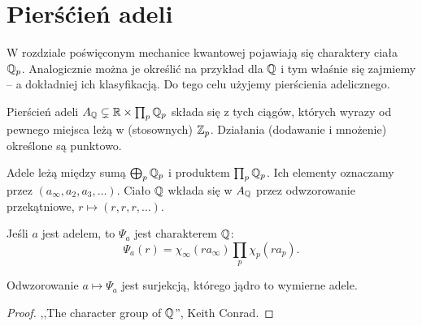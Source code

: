 \section{Pierśćień adeli}
W rozdziale poświęconym mechanice kwantowej pojawiają się charaktery ciała $\mathbb Q_p$.
Analogicznie można je określić na przykład dla $\mathbb Q$ i tym właśnie się zajmiemy -- a dokładniej ich klasyfikacją.
Do tego celu użyjemy pierścienia adelicznego.

\begin{definicja}
	Pierścień adeli $A_\mathbb Q \subsetneq \mathbb R \times \prod_p \mathbb Q_p$ składa się z tych ciągów, których wyrazy od pewnego miejsca leżą w (stosownych) $\mathbb Z_p$.
	Działania (dodawanie i mnożenie) określone są punktowo.
\end{definicja}

Adele leżą między sumą $\bigoplus_p \mathbb Q_p$ i produktem $\prod_p \mathbb Q_p$.
Ich elementy oznaczamy przez $(a_\infty, a_2, a_3, \ldots)$.
Ciało $\mathbb Q$ wkłada się w $A_\mathbb Q$ przez odwzorowanie przekątniowe, $r \mapsto (r, r, r, \ldots)$.

\begin{definicja}
	Jeśli $a$ jest adelem, to $\Psi_a$ jest charakterem $\mathbb Q$:
	\[
		\Psi_a(r) = \chi_\infty(r a_\infty) \prod_p \chi_p(r a_p).
	\]
\end{definicja}

\begin{fakt}
	Odwzorowanie $a \mapsto \Psi_a$ jest surjekcją, którego jądro to wymierne adele.
\end{fakt}

\begin{proof}
	,,The character group of $\mathbb Q$'', Keith Conrad.
\end{proof}